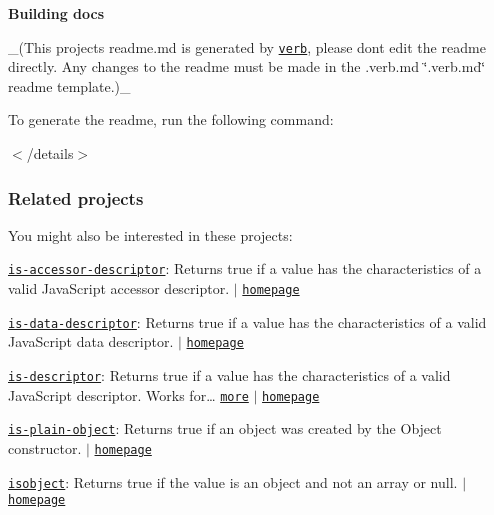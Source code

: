 {\bfseries Building docs}

\+\_\+(This project\textquotesingle{}s readme.\+md is generated by \href{https://github.com/verbose/verb-generate-readme}{\tt verb}, please don\textquotesingle{}t edit the readme directly. Any changes to the readme must be made in the .verb.\+md \char`\"{}.\+verb.\+md\char`\"{} readme template.)\+\_\+

To generate the readme, run the following command\+:




$<$/details$>$

\subsubsection*{Related projects}

You might also be interested in these projects\+:


\begin{DoxyItemize}
\item \href{https://www.npmjs.com/package/is-accessor-descriptor}{\tt is-\/accessor-\/descriptor}\+: Returns true if a value has the characteristics of a valid Java\+Script accessor descriptor. $\vert$ \href{https://github.com/jonschlinkert/is-accessor-descriptor}{\tt homepage}
\item \href{https://www.npmjs.com/package/is-data-descriptor}{\tt is-\/data-\/descriptor}\+: Returns true if a value has the characteristics of a valid Java\+Script data descriptor. $\vert$ \href{https://github.com/jonschlinkert/is-data-descriptor}{\tt homepage}
\item \href{https://www.npmjs.com/package/is-descriptor}{\tt is-\/descriptor}\+: Returns true if a value has the characteristics of a valid Java\+Script descriptor. Works for… \href{https://github.com/jonschlinkert/is-descriptor}{\tt more} $\vert$ \href{https://github.com/jonschlinkert/is-descriptor}{\tt homepage}
\item \href{https://www.npmjs.com/package/is-plain-object}{\tt is-\/plain-\/object}\+: Returns true if an object was created by the {\ttfamily Object} constructor. $\vert$ \href{https://github.com/jonschlinkert/is-plain-object}{\tt homepage}
\item \href{https://www.npmjs.com/package/isobject}{\tt isobject}\+: Returns true if the value is an object and not an array or null. $\vert$ \href{https://github.com/jonschlinkert/isobject}{\tt homepage}
\end{DoxyItemize}

